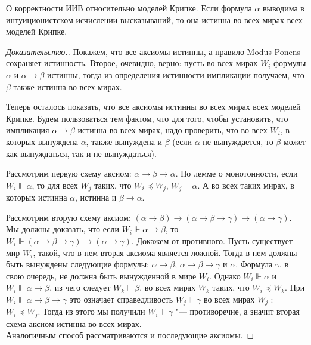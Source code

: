 \begin{theorem}{О корректности ИИВ относительно моделей Крипке.}
Если формула $\alpha$ выводима в интуиционистском исчислении высказываний, 
то она истинна во всех мирах всех моделей Крипке.
\end{theorem}
\begin{proof}[Доказательство.] Покажем, что все аксиомы истинны, а правило Modus Ponens сохраняет истинность. 
Второе, очевидно, верно: пусть во всех мирах $W_i$ формулы $\alpha$ и $\alpha \rightarrow \beta$ истинны, тогда из определения 
истинности импликации получаем, что $\beta$ также истинна во всех мирах.

Теперь осталось показать, что все аксиомы истинны во всех мирах всех моделей Крипке. 
Будем пользоваться тем фактом, что для того, чтобы установить, что импликация $\alpha \rightarrow \beta$ истинна во всех мирах, 
надо проверить, что во всех  $W_i$, в которых вынуждена $\alpha$, также вынуждена и $\beta$ 
(если $\alpha$ не вынуждается, то $\beta$ может как вынуждаться, так и не вынуждаться). 

Рассмотрим первую схему аксиом: $\alpha \rightarrow \beta \rightarrow \alpha$. 
По лемме о монотонности, если $W_i \Vdash \alpha$, то для всех $W_j$ таких, что $W_i \preceq W_j$, $W_j \Vdash \alpha$.
А во всех таких мирах, в которых истинна $\alpha$, истинна и $\beta \rightarrow \alpha$.

Рассмотрим вторую схему аксиом: $(\alpha \rightarrow \beta) \rightarrow (\alpha \rightarrow \beta \rightarrow \gamma) \rightarrow (\alpha \rightarrow \gamma)$.
Мы должны доказать, что если $W_i \Vdash \alpha \rightarrow \beta$, то $W_i \Vdash (\alpha \rightarrow \beta \rightarrow \gamma) \rightarrow (\alpha \rightarrow \gamma)$. 
Докажем от противного. Пусть существует мир  $W_i$, такой, что в нем вторая аксиома является ложной. 
Тогда в нем должны быть вынуждены следующие формулы: $\alpha \rightarrow \beta$, $\alpha \rightarrow \beta \rightarrow \gamma$ и $\alpha$. 
Формула $\gamma$, в свою очередь, не должна быть вынужденной в мире $W_i$. 
Однако $W_i \Vdash \alpha$ и $W_i \Vdash \alpha \rightarrow \beta$, из чего следует  $W_k \Vdash \beta$.
во всех мирах $W_k$ таких, что  $W_i \preceq W_k$. При $W_i \Vdash \alpha \rightarrow \beta \rightarrow \gamma$ это означает справедливость
$W_j \Vdash \gamma$ во всех мирах $W_j$ : $W_i \preceq W_j$. Тогда из этого мы получили $W_i \Vdash \gamma$ "--- противоречие, а значит 
вторая схема аксиом истинна во всех мирах.
\\Аналогичным способ рассматриваются и последующие аксиомы.
\end{proof}


